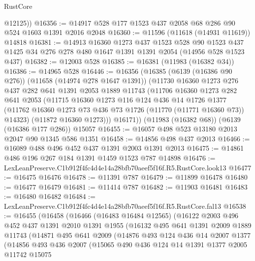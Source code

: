 \begin{lexlean}{RustCore}
\begin{coremodule}
        @12125))
@16356 := @14917 @528 @177 @1523 @437 @2058 @68 @286 @90 @524 @1603 @1391 @2016 @2048
@16360 := @11596 (@11618 (@14931 @11619)) @14818
@16381 := @14913
    @16360
    @1273
    @437
    @1523
    @528
    @90
    @1523
    @437
    @1425
    @34
    @276
    @278
    @480
    @1647
    @1391
    @1391
    @2054
    (@14956 @528 @1523 @437)
@16382 := @12003 @528
@16385 := @16381 (@11983 (@16382 @34))
@16386 := @14965 @528
@16446 := @16356
    (@16385
      (@6139 (@16386 @90 @276))
      (@11658 (@14974 @278 @1647 @1391))
      (@11730
        @16360
        @1273
        @276
        @437
        @282
        @641
        @1391
        @2053
        @1889
        @11743
        (@11706
          @16360
          @1273
          @282
          @641
          @2053
          (@11715
            @16360
            @1273
            @116
            @124
            @436
            @14
            @1726
            @1377
            (@11762 @16360 @1273 @73 @436 @73 @1726 (@11770 (@11771 @16360 @73)) @14323)
            (@11872 @16360 @1273)))
        @16171))
    (@11983 (@16382 @68))
    (@6139 (@16386 @177 @286))
    @15057
@16455 := @16057 @498 @523 @13180 @2013 @2047 @90 @1345 @586 @1351
@16458 := @14856 @498 @437 @2013
@16466 := @16089 @488 @496 @452 @437 @1391 @2003 @1391 @2013
@16475 := @14861 @486 @196 @267 @184 @1391 @1459 @1523 @787 @14898
@16476 := LexLeanPreserve.C1b912f4fc4d4e14a28bfb70aeef5f16f.R5.RustCore.look13
@16477 := @16475 @16476
@16478 := @11391 @787
@16479 := @11899 @16478
@16480 := @16477 @16479
@16481 := @11414 @787
@16482 := @11903 @16481
@16483 := @16480 @16482
@16484 := LexLeanPreserve.C1b912f4fc4d4e14a28bfb70aeef5f16f.R5.RustCore.fal13
@16538 := @16455
    (@16458
      (@16466
        (@16483 @16484 @12565)
        (@16122
          @2003
          @496
          @452
          @437
          @1391
          @2010
          @1391
          @1955
          (@16132
            @495
            @641
            @1391
            @2009
            @1889
            @11743
            (@14871
              @495
              @641
              @2009
              (@14876
                @493
                @124
                @436
                @14
                @2007
                @1377
                (@14856
                  @493
                  @436
                  @2007
                  (@15065
                    @490
                    @436
                    @124
                    @14
                    @1391
                    @1377
                    @2005
                    @11742
                    @15075

\end{coremodule}
\end{lexlean}
